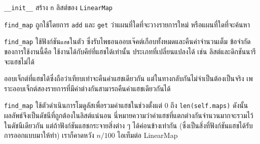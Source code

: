 \verb"__init__" สร้าง {\tt n} ลิสต์ของ {\tt LinearMap}


\verb"find_map" ถูกใช้โดยการ {\tt add} และ {\tt get} ว่าแผนที่ใดที่จะวางรายการใหม่ หรือแผนที่ใดที่จะค้นหา


\verb"find_map" ใช้ฟังก์ชัน{\tt แฮช}ในตัว ซึ่งรับไพธอนออบเจ๊คต์เกือบทั้งหมดและคืนค่าจำนวนเต็ม ข้อจำกัดของการใช้งานนี้คือ
ใช้งานได้กับคีย์ที่แฮชได้เท่านั้น ประเภทที่เปลี่ยนแปลงได้ เช่น ลิสต์และดิกชันนารีจะแฮชไม่ได้ 


ออบเจ็กต์ที่แฮชได้ซึ่งถือว่าเทียบเท่าจะคืนค่าแฮชเดียวกัน 
แต่ในทางกลับกันไม่จำเป็นต้องเป็นจริง เพราะออบเจ็กต์สองรายการที่มีค่าต่างกันสามารถคืนค่าแฮชเดียวกันได้


\verb"find_map"  ใช้ตัวดำเนินการโมดูลัสเพื่อรวมค่าแฮชในช่วงตั้งแต่ 0 ถึง {\tt len(self.maps)} 
ดังนั้นผลลัพธ์จึงเป็นดัชนีที่ถูกต้องในลิสต์แน่นอน นี่หมายความว่าค่าแฮชที่แตกต่างกันจำนวนมากจะรวมไว้ในดัชนีเดียวกัน 
แต่ถ้าฟังก์ชันแฮชกระจายสิ่งต่าง ๆ ได้ค่อนข้างเท่ากัน (ซึ่งเป็นสิ่งที่ฟังก์ชันแฮชได้รับการออกแบบมาให้ทำ) 
เราก็คาดหวัง $n/100$ ไอเท็มต่อ LinearMap


